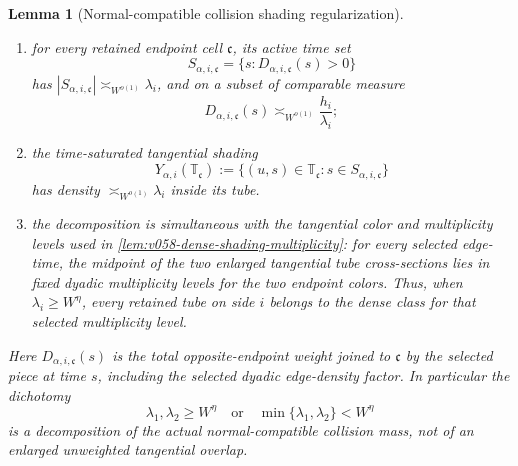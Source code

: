 \documentclass[10pt]{article}
\newtheorem{lemma}[theorem]{Lemma}
\begin{document}
\begin{lemma}[Normal-compatible collision shading regularization]
\begin{enumerate}[label=\textnormal{(\roman*)}]
\begin{equation}
{\qquad
m_ih_i\asymp_{W^{o(1)}}\mathcal C_\alpha;
}
\end{equation}
\item for every retained endpoint cell \(\mathfrak c\), its active time set
\[
S_{\alpha,i,\mathfrak c}
=
\{s:D_{\alpha,i,\mathfrak c}(s)>0\}
\]
has \(|S_{\alpha,i,\mathfrak c}|\asymp_{W^{o(1)}}\lambda_i\), and on a subset of comparable
measure
\begin{equation}
\label{eq:v060-instantaneous-degree}
\boxed{
D_{\alpha,i,\mathfrak c}(s)
\asymp_{W^{o(1)}}
\frac{h_i}{\lambda_i};
}
\end{equation}
\item the time-saturated tangential shading
\begin{equation}
\label{eq:v060-time-saturated-shading}
Y_{\alpha,i}(\mathbb T_{\mathfrak c})
:=
\{(u,s)\in\mathbb T_{\mathfrak c}:s\in S_{\alpha,i,\mathfrak c}\}
\end{equation}
has density \(\asymp_{W^{o(1)}}\lambda_i\) inside its tube.
\item the decomposition is simultaneous with the tangential color and multiplicity levels used in
\cref{lem:v058-dense-shading-multiplicity}: for every selected edge-time, the midpoint of the two
enlarged tangential tube cross-sections lies in fixed dyadic multiplicity levels for the two
endpoint colors.  Thus, when \(\lambda_i\ge W^\eta\), every retained tube on side \(i\) belongs to
the dense class for that selected multiplicity level.
\end{enumerate}
Here \(D_{\alpha,i,\mathfrak c}(s)\) is the total opposite-endpoint weight joined to
\(\mathfrak c\) by the selected piece at time \(s\), including the selected dyadic edge-density
factor.  In particular the dichotomy
\begin{equation}
\label{eq:v060-dense-sparse-actual-collision}
\boxed{
\lambda_1,\lambda_2\ge W^\eta
\quad\text{or}\quad
\min\{\lambda_1,\lambda_2\}<W^\eta
}
\end{equation}
is a decomposition of the actual normal-compatible collision mass, not of an enlarged unweighted
tangential overlap.
\end{lemma}
\end{document}

